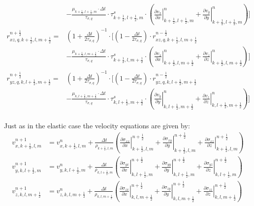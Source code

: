 \documentclass[pdftex,a4paper,parskip,listof=totoc,bibliography=totoc,onehalfspacing,12pt]{scrreprt}
\begin{document}
\begin{align*}
	& -\frac{\mu_{k+\frac{1}{2},l+\frac{1}{2},m}\cdot\Delta t}{\tau_{\sigma,q}}\cdot \tau^s_{k+\frac{1}{2},l+\frac{1}{2},m} \cdot \left( \left.\frac{\partial v_x}{\partial x}\right\rvert_{k+\frac{1}{2},l+\frac{1}{2},m}^{n} + \left.\frac{\partial v_y}{\partial y}\right\rvert_{k+\frac{1}{2},l+\frac{1}{2},m}^{n} \right)\Bigg]\\
	r_{xz,q,k+\frac{1}{2},l,m+\frac{1}{2}}^{n+\frac{1}{2}} =& \left( 1+ \frac{\Delta t}{2\tau_{\sigma,q}} \right)^{-1}\cdot \Bigg[\left( 1- \frac{\Delta t}{2\tau_{\sigma,q}}  \right) \cdot r_{xz,q,k+\frac{1}{2},l,m+\frac{1}{2}}^{n-\frac{1}{2}} \\ 
	& -\frac{\mu_{k+\frac{1}{2},l,m+\frac{1}{2}}\cdot\Delta t}{\tau_{\sigma,q}}\cdot \tau^s_{k+\frac{1}{2},l,m+\frac{1}{2}} \cdot \left( \left.\frac{\partial v_x}{\partial x}\right\rvert_{k+\frac{1}{2},l,m+\frac{1}{2}}^{n} + \left.\frac{\partial v_z}{\partial z}\right\rvert_{k+\frac{1}{2},l,m+\frac{1}{2}}^{n} \right)\Bigg]\\
	r_{yz,q,k,l+\frac{1}{2},m+\frac{1}{2}}^{n+\frac{1}{2}} =& \left( 1+ \frac{\Delta t}{2\tau_{\sigma,q}} \right)^{-1}\cdot \Bigg[\left( 1- \frac{\Delta t}{2\tau_{\sigma,q}}  \right) \cdot r_{yz,q,k,l+\frac{1}{2},m+\frac{1}{2}}^{n-\frac{1}{2}} \\ 
	& -\frac{\mu_{k,l+\frac{1}{2},m+\frac{1}{2}}\cdot\Delta t}{\tau_{\sigma,q}}\cdot \tau^s_{k,l+\frac{1}{2},m+\frac{1}{2}} \cdot \left( \left.\frac{\partial v_y}{\partial y}\right\rvert_{k,l+\frac{1}{2},m+\frac{1}{2}}^{n} + \left.\frac{\partial v_z}{\partial z}\right\rvert_{k,l+\frac{1}{2},m+\frac{1}{2}}^{n} \right)\Bigg] \\
\end{align*}

Just as in the elastic case the velocity equations are given by:
\begin{align*}
	v_{x,k+\frac{1}{2},l,m}^{n+1} &= v_{x,k+\frac{1}{2},l,m}^n + \frac{\Delta t}{\rho_{k+\frac{1}{2},l,m}}  \left( \left.\frac{\partial\sigma_{xx}}{\partial x}\right\rvert_{k+\frac{1}{2},l,m}^{n+\frac{1}{2}} + \left.\frac{\partial\sigma_{xy}}{\partial y}\right\rvert_{k+\frac{1}{2},l,m}^{n+\frac{1}{2}} + \left.\frac{\partial\sigma_{xz}}{\partial z}\right\rvert_{k+\frac{1}{2},l,m}^{n+\frac{1}{2}} \right)\\
	v_{y,k,l+\frac{1}{2},m}^{n+1} &= v_{y,k,l+\frac{1}{2},m}^n + \frac{\Delta t}{\rho_{k,l+\frac{1}{2},m}}  \left( \left.\frac{\partial\sigma_{yx}}{\partial x}\right\rvert_{k,l+\frac{1}{2},m}^{n+\frac{1}{2}} + \left.\frac{\partial\sigma_{yy}}{\partial y}\right\rvert_{k,l+\frac{1}{2},m}^{n+\frac{1}{2}} + \left.\frac{\partial\sigma_{yz}}{\partial z}\right\rvert_{k,l+\frac{1}{2},m}^{n+\frac{1}{2}} \right)\\
	v_{z,k,l,m+\frac{1}{2}}^{n+1} &= v_{z,k,l,m+\frac{1}{2}}^n + \frac{\Delta t}{\rho_{k,l,m+\frac{1}{2}}}  \left( \left.\frac{\partial\sigma_{zx}}{\partial x}\right\rvert_{k,l,m+\frac{1}{2}}^{n+\frac{1}{2}} + \left.\frac{\partial\sigma_{zy}}{\partial y}\right\rvert_{k,l,m+\frac{1}{2}}^{n+\frac{1}{2}} + \left.\frac{\partial\sigma_{zz}}{\partial z}\right\rvert_{k,l,m+\frac{1}{2}}^{n+\frac{1}{2}} \right)
\end{align*}
\end{document}
